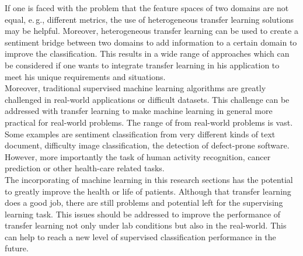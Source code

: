 If one is faced with the problem that the feature spaces of two domains are not equal, e.\,g., different metrics, the use of heterogeneous transfer learning solutions may be helpful.
Moreover, heterogeneous transfer learning can be used to create a sentiment bridge between two domains to add information to a certain domain to improve the classification.
This results in a wide range of approaches which can be considered if one wants to integrate transfer learning in his application to meet his unique requirements and situations.\\
Moreover, traditional supervised machine learning algorithms are greatly challenged in real-world applications or difficult datasets.\cite{Pan.2010}
This challenge can be addressed with transfer learning to make machine learning in general more practical for real-world problems.
The range of from real-world problems is vast.
Some examples are sentiment classification from very different kinds of text document, difficulty image classification, the detection of defect-prone software.\cite{Weiss.2016}
However, more importantly the task of human activity recognition, cancer prediction or other health-care related tasks.\cite{Burlina.2017}\cite{Kourou.2015}\\
The incorporating of machine learning in this research sections has the potential to greatly improve the health or life of patients.
Although that transfer learning does a good job, there are still problems and potential left for the supervising learning task.
This issues should be addressed to improve the performance of transfer learning not only under lab conditions but also in the real-world.
This can help to reach a new level of supervised classification performance in the future.
